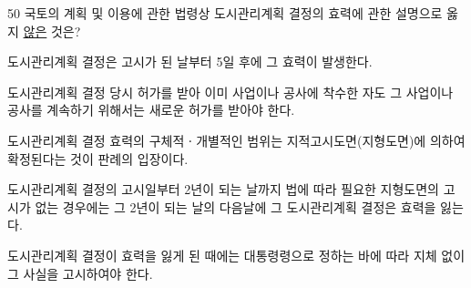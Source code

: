 \begin{question}{50}
국토의 계획 및 이용에 관한 법령상 도시관리계획 결정의 효력에 관한 설명으로 옳지 \uline{않은} 것은?
\begin{choices}
  \item 도시관리계획 결정은 고시가 된 날부터 5일 후에 그 효력이 발생한다.
  \item 도시관리계획 결정 당시 허가를 받아 이미 사업이나 공사에 착수한 자도 그 사업이나 공사를 계속하기 위해서는 새로운 허가를 받아야 한다.
  \item 도시관리계획 결정 효력의 구체적ㆍ개별적인 범위는 지적고시도면(지형도면)에 의하여 확정된다는 것이 판례의 입장이다.
  \item 도시관리계획 결정의 고시일부터 2년이 되는 날까지 법에 따라 필요한 지형도면의 고시가 없는 경우에는 그 2년이 되는 날의 다음날에 그 도시관리계획 결정은 효력을 잃는다.
  \item 도시관리계획 결정이 효력을 잃게 된 때에는 대통령령으로 정하는 바에 따라 지체 없이 그 사실을 고시하여야 한다.
\end{choices}
\end{question}
